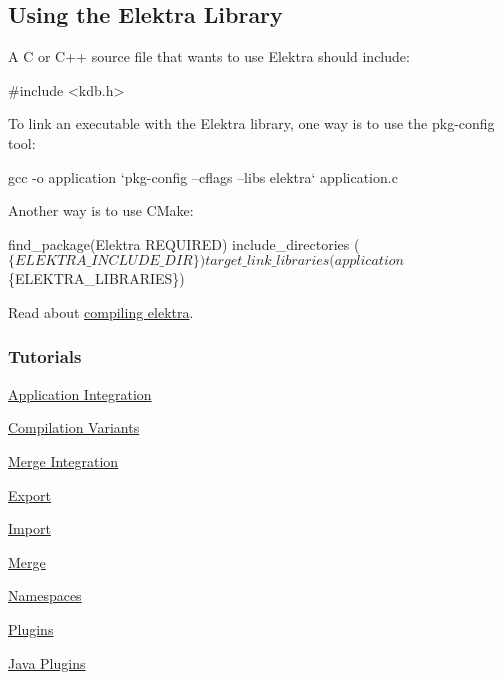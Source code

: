 \subsection*{Using the Elektra Library}

A C or C++ source file that wants to use Elektra should include\+:


\begin{DoxyCode}
\textcolor{preprocessor}{#include <kdb.h>}
\end{DoxyCode}


To link an executable with the Elektra library, one way is to use the {\ttfamily pkg-\/config} tool\+:


\begin{DoxyCode}
gcc -o application `pkg-config --cflags --libs elektra` application.c
\end{DoxyCode}


Another way is to use C\+Make\+:


\begin{DoxyCode}
find\_package(Elektra REQUIRED)
include\_directories ($\{ELEKTRA\_INCLUDE\_DIR\})
target\_link\_libraries (application $\{ELEKTRA\_LIBRARIES\})
\end{DoxyCode}


Read about \hyperlink{doc_COMPILE_md}{compiling elektra}.

\subsubsection*{Tutorials}


\begin{DoxyItemize}
\item \hyperlink{doc_tutorials_application-integration_md}{Application Integration}
\item \hyperlink{doc_tutorials_compilation-variants_md}{Compilation Variants}
\item \hyperlink{doc_tutorials_elektra-merge-integration_md}{Merge Integration}
\item \hyperlink{doc_tutorials_export_md}{Export}
\item \hyperlink{doc_tutorials_import_md}{Import}
\item \hyperlink{doc_tutorials_merge_md}{Merge}
\item \hyperlink{doc_tutorials_namespaces_md}{Namespaces}
\item \hyperlink{doc_tutorials_plugins_md}{Plugins}
\item \hyperlink{doc_tutorials_java-plugins_md}{Java Plugins}
\end{DoxyItemize}

